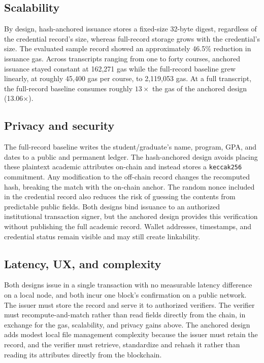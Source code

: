 \documentclass[conference]{IEEEtran}
\begin{document}
\subsection{Scalability}
By design, hash-anchored issuance stores a fixed-size 32-byte digest, regardless of the credential record's size, whereas full-record storage grows with the credential's size. The evaluated sample record showed an approximately 46.5\% reduction in issuance gas. Across transcripts ranging from one to forty courses, anchored issuance stayed constant at 162,271 gas while the full-record baseline grew linearly, at roughly 45,400 gas per course, to 2,119,053 gas. At a full transcript, the full-record baseline consumes roughly $13\times$ the gas of the anchored design (13.06$\times$). 

\subsection{Privacy and security}
The full-record baseline writes the student/graduate's name, program, GPA, and dates to a public and permanent ledger. The hash-anchored design avoids placing these plaintext academic attributes on-chain and instead stores a \verb|keccak256| commitment. Any modification to the off-chain record changes the recomputed hash, breaking the match with the on-chain anchor. The random nonce included in the credential record also reduces the risk of guessing the contents from predictable public fields. Both designs bind issuance to an authorized institutional transaction signer, but the anchored design provides this verification without publishing the full academic record. Wallet addresses, timestamps, and credential status remain visible and may still create linkability.

\subsection{Latency, UX, and complexity}
Both designs issue in a single transaction with no measurable latency difference on a local node, and both incur one block's confirmation on a public network. The issuer must store the record and serve it to authorized verifiers. The verifier must recompute-and-match rather than read fields directly from the chain, in exchange for the gas, scalability, and privacy gains above.
The anchored design adds modest local file management complexity because the issuer must retain the record, and the verifier must retrieve, standardize and rehash it rather than reading its attributes directly from the blockchain.
\end{document}
